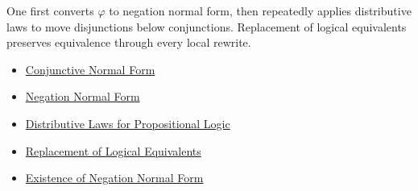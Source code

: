 \begin{remark*}[Interpretation]
One first converts \(\varphi\) to negation normal form, then repeatedly applies
distributive laws to move disjunctions below conjunctions. Replacement of
logical equivalents preserves equivalence through every local rewrite.
\end{remark*}

\begin{dependencies}
\begin{itemize}
  \item \hyperref[def:conjunctive-normal-form-propositional-logic]{Conjunctive Normal Form}
  \item \hyperref[def:negation-normal-form-propositional-logic]{Negation Normal Form}
  \item \hyperref[thm:distributive-laws-propositional-logic]{Distributive Laws for Propositional Logic}
  \item \hyperref[thm:replacement-of-logical-equivalents-propositional-logic]{Replacement of Logical Equivalents}
  \item \hyperref[thm:existence-negation-normal-form-propositional-logic]{Existence of Negation Normal Form}
\end{itemize}
\end{dependencies}
